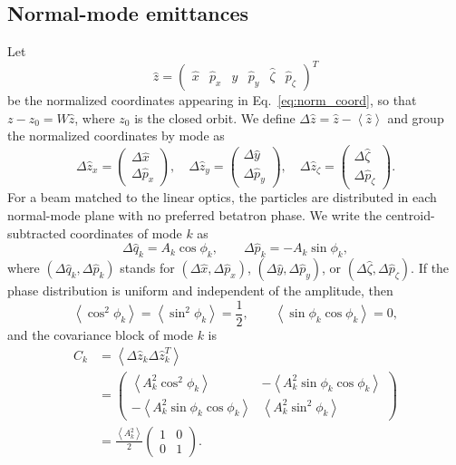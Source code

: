 \subsection{Normal-mode emittances}

Let
\begin{equation}
\hat{z} =
\left(\begin{array}{llllll}
\hat{x} & \hat{p}_x & \hat{y} & \hat{p}_y &
\hat{\zeta} & \hat{p}_\zeta
\end{array}\right)^T
\end{equation}
be the normalized coordinates appearing in Eq.~\ref{eq:norm_coord}, so that
$z-z_0=W\hat{z}$, where $z_0$ is the closed orbit. We define
$\Delta\hat{z}=\hat{z}-\left<\hat{z}\right>$ and group the normalized
coordinates by mode as
\begin{equation}
\Delta\hat{z}_x =
\left(\begin{array}{c}
\Delta\hat{x}\\
\Delta\hat{p}_x
\end{array}\right),\quad
\Delta\hat{z}_y =
\left(\begin{array}{c}
\Delta\hat{y}\\
\Delta\hat{p}_y
\end{array}\right),\quad
\Delta\hat{z}_\zeta =
\left(\begin{array}{c}
\Delta\hat{\zeta}\\
\Delta\hat{p}_\zeta
\end{array}\right).
\end{equation}
For a beam matched to the linear optics, the particles are distributed in each
normal-mode plane with no preferred betatron phase. We write the
centroid-subtracted coordinates of mode $k$ as
\begin{equation}
\Delta\hat{q}_k = A_k \cos\phi_k,\qquad
\Delta\hat{p}_k = -A_k \sin\phi_k,
\end{equation}
where $(\Delta\hat{q}_k,\Delta\hat{p}_k)$ stands for
$(\Delta\hat{x},\Delta\hat{p}_x)$,
$(\Delta\hat{y},\Delta\hat{p}_y)$, or
$(\Delta\hat{\zeta},\Delta\hat{p}_\zeta)$. If the phase distribution is uniform
and independent of the amplitude, then
\begin{equation}
\left<\cos^2\phi_k\right> = \left<\sin^2\phi_k\right> = \frac{1}{2},
\qquad
\left<\sin\phi_k\cos\phi_k\right> = 0,
\end{equation}
and the covariance block of mode $k$ is
\begin{align}
C_k
&= \left<\Delta\hat{z}_k\Delta\hat{z}_k^T\right>\nonumber\\
&=
\left(\begin{array}{cc}
\left<A_k^2\cos^2\phi_k\right> &
-\left<A_k^2\sin\phi_k\cos\phi_k\right>\\
-\left<A_k^2\sin\phi_k\cos\phi_k\right> &
\left<A_k^2\sin^2\phi_k\right>
\end{array}\right)\nonumber\\
&=
\frac{\left<A_k^2\right>}{2}
\left(\begin{array}{cc}
1 & 0\\
0 & 1
\end{array}\right).
\end{align}
